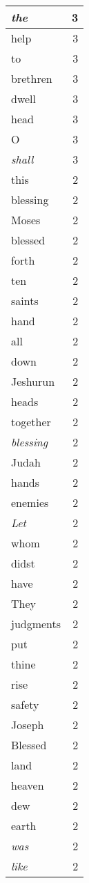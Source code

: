 \begin{center}
\begin{longtable}{l|r}
\emph{the} & 3 \\ \hline
help & 3 \\ \hline
to & 3 \\ \hline
brethren & 3 \\ \hline
dwell & 3 \\ \hline
head & 3 \\ \hline
O & 3 \\ \hline
\emph{shall} & 3 \\ \hline
this & 2 \\ \hline
blessing & 2 \\ \hline
Moses & 2 \\ \hline
blessed & 2 \\ \hline
forth & 2 \\ \hline
ten & 2 \\ \hline
saints & 2 \\ \hline
hand & 2 \\ \hline
all & 2 \\ \hline
down & 2 \\ \hline
Jeshurun & 2 \\ \hline
heads & 2 \\ \hline
together & 2 \\ \hline
\emph{blessing} & 2 \\ \hline
Judah & 2 \\ \hline
hands & 2 \\ \hline
enemies & 2 \\ \hline
\emph{Let} & 2 \\ \hline
whom & 2 \\ \hline
didst & 2 \\ \hline
have & 2 \\ \hline
They & 2 \\ \hline
judgments & 2 \\ \hline
put & 2 \\ \hline
thine & 2 \\ \hline
rise & 2 \\ \hline
safety & 2 \\ \hline
Joseph & 2 \\ \hline
Blessed & 2 \\ \hline
land & 2 \\ \hline
heaven & 2 \\ \hline
dew & 2 \\ \hline
earth & 2 \\ \hline
\emph{was} & 2 \\ \hline
\emph{like} & 2 \\ \hline

\end{longtable}
\end{center}
